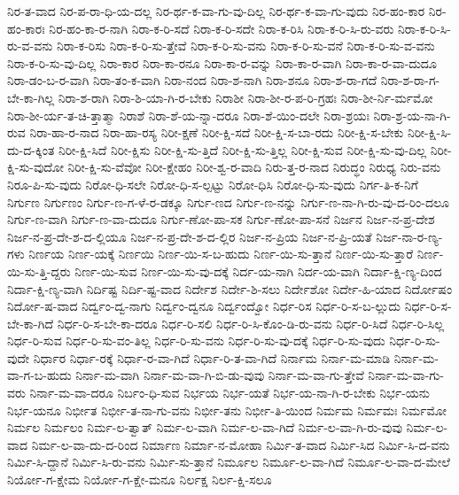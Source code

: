 {ನಿರ-ತ-ವಾದ
ನಿರ-ಪ-ರಾ-ಧಿ-ಯ-ದಲ್ಲ
ನಿರ-ರ್ಥ-ಕ-ವಾ-ಗು-ವು-ದಿಲ್ಲ
ನಿರ-ರ್ಥ-ಕ-ವಾ-ಗು-ವುದು
ನಿರ-ಹಂ-ಕಾರ
ನಿರ-ಹಂ-ಕಾರಃ
ನಿರ-ಹಂ-ಕಾ-ರ-ನಾಗಿ
ನಿರಾ-ಕ-ರಿ-ಸದೆ
ನಿರಾ-ಕ-ರಿ-ಸದೇ
ನಿರಾ-ಕ-ರಿಸಿ
ನಿರಾ-ಕ-ರಿ-ಸಿ-ರು-ವರು
ನಿರಾ-ಕ-ರಿ-ಸಿ-ರು-ವ-ವನು
ನಿರಾ-ಕ-ರಿಸು
ನಿರಾ-ಕ-ರಿ-ಸು-ತ್ತೇವೆ
ನಿರಾ-ಕ-ರಿ-ಸು-ವನು
ನಿರಾ-ಕ-ರಿ-ಸು-ವನೆ
ನಿರಾ-ಕ-ರಿ-ಸು-ವ-ವನು
ನಿರಾ-ಕ-ರಿ-ಸು-ವು-ದಿಲ್ಲ
ನಿರಾ-ಕಾರ
ನಿರಾ-ಕಾ-ರನೂ
ನಿರಾ-ಕಾ-ರ-ವನ್ನು
ನಿರಾ-ಕಾ-ರ-ವಾಗಿ
ನಿರಾ-ಕಾ-ರ-ವಾ-ದುದೂ
ನಿರಾ-ಡಂ-ಬ-ರ-ವಾಗಿ
ನಿರಾ-ತಂ-ಕ-ವಾಗಿ
ನಿರಾ-ನಂದ
ನಿರಾ-ಶ-ನಾಗಿ
ನಿರಾ-ಶನೂ
ನಿರಾ-ಶ-ರಾ-ಗದೆ
ನಿರಾ-ಶ-ರಾ-ಗ-ಬೇ-ಕಾ-ಗಿಲ್ಲ
ನಿರಾ-ಶ-ರಾಗಿ
ನಿರಾ-ಶಿ-ಯಾ-ಗಿ-ರ-ಬೇಕು
ನಿರಾಶೀ
ನಿರಾ-ಶೀ-ರ-ಪ-ರಿ-ಗ್ರಹಃ
ನಿರಾ-ಶೀ-ರ್ನಿ-ರ್ಮಮೋ
ನಿರಾ-ಶೀ-ರ್ಯ-ತ-ಚಿ-ತ್ತಾತ್ಮಾ
ನಿರಾಶೆ
ನಿರಾ-ಶೆ-ಯ-ನ್ನಾ-ದರೂ
ನಿರಾ-ಶೆ-ಯಿಂ-ದಲೇ
ನಿರಾ-ಶ್ರಯಃ
ನಿರಾ-ಶ್ರ-ಯ-ನಾ-ಗಿ-ರುವ
ನಿರಾ-ಹಾ-ರ-ನಾದ
ನಿರಾ-ಹಾ-ರಸ್ಯ
ನಿರೀ-ಕ್ಷಣೆ
ನಿರೀ-ಕ್ಷಿ-ಸದೆ
ನಿರೀ-ಕ್ಷಿ-ಸ-ಬಾ-ರದು
ನಿರೀ-ಕ್ಷಿ-ಸ-ಬೇಕು
ನಿರೀ-ಕ್ಷಿ-ಸಿ-ದು-ದ-ಕ್ಕಿಂತ
ನಿರೀ-ಕ್ಷಿ-ಸಿದೆ
ನಿರೀ-ಕ್ಷಿಸು
ನಿರೀ-ಕ್ಷಿ-ಸು-ತ್ತಿದೆ
ನಿರೀ-ಕ್ಷಿ-ಸು-ತ್ತಿಲ್ಲ
ನಿರೀ-ಕ್ಷಿ-ಸುವ
ನಿರೀ-ಕ್ಷಿ-ಸು-ವು-ದಿಲ್ಲ
ನಿರೀ-ಕ್ಷಿ-ಸು-ವುದೋ
ನಿರೀ-ಕ್ಷಿ-ಸು-ವೆವೋ
ನಿರೀ-ಕ್ಷೇಹಂ
ನಿರೀ-ಶ್ವ-ರ-ವಾದಿ
ನಿರು-ತ್ತ-ರ-ನಾದ
ನಿರುದ್ಧಂ
ನಿರುಧ್ಯ
ನಿರು-ವನು
ನಿರೂ-ಪಿ-ಸು-ವುದು
ನಿರೋ-ಧಿ-ಸಲೇ
ನಿರೋ-ಧಿ-ಸ-ಲ್ಪಟ್ಟು
ನಿರೋ-ಧಿಸಿ
ನಿರೋ-ಧಿ-ಸು-ವುದು
ನಿರ್ಗ-ತಿ-ಕ-ನಿಗೆ
ನಿರ್ಗುಣ
ನಿರ್ಗುಣಂ
ನಿರ್ಗು-ಣ-ಗ-ಳೆ-ರ-ಡಕ್ಕೂ
ನಿರ್ಗು-ಣದ
ನಿರ್ಗು-ಣ-ನನ್ನು
ನಿರ್ಗು-ಣ-ನಾ-ಗಿ-ರು-ವು-ದ-ರಿಂ-ದಲೂ
ನಿರ್ಗು-ಣ-ವಾಗಿ
ನಿರ್ಗು-ಣ-ವಾ-ದುದೂ
ನಿರ್ಗು-ಣೋ-ಪಾ-ಸಕ
ನಿರ್ಗು-ಣೋ-ಪಾ-ಸನೆ
ನಿರ್ಜನ
ನಿರ್ಜ-ನ-ಪ್ರ-ದೇಶ
ನಿರ್ಜ-ನ-ಪ್ರ-ದೇ-ಶ-ದ-ಲ್ಲಿಯೂ
ನಿರ್ಜ-ನ-ಪ್ರ-ದೇ-ಶ-ದ-ಲ್ಲಿರ
ನಿರ್ಜ-ನ-ಪ್ರಿಯ
ನಿರ್ಜ-ನ-ಪ್ರಿ-ಯತೆ
ನಿರ್ಜ-ನಾ-ರ-ಣ್ಯ-ಗಳು
ನಿರ್ಣಯ
ನಿರ್ಣ-ಯಕ್ಕೆ
ನಿರ್ಣಯಿ
ನಿರ್ಣ-ಯಿ-ಸ-ಬ-ಹುದು
ನಿರ್ಣ-ಯಿ-ಸು-ತ್ತಾನೆ
ನಿರ್ಣ-ಯಿ-ಸು-ತ್ತಾರೆ
ನಿರ್ಣ-ಯಿ-ಸು-ತ್ತಿ-ದ್ದರು
ನಿರ್ಣ-ಯಿ-ಸುವ
ನಿರ್ಣ-ಯಿ-ಸು-ವು-ದಕ್ಕೆ
ನಿರ್ದ-ಯ-ನಾಗಿ
ನಿರ್ದ-ಯ-ವಾಗಿ
ನಿರ್ದಾ-ಕ್ಷಿ-ಣ್ಯ-ದಿಂದ
ನಿರ್ದಾ-ಕ್ಷಿ-ಣ್ಯ-ವಾಗಿ
ನಿರ್ದಿಷ್ಟ
ನಿರ್ದಿ-ಷ್ಟ-ವಾದ
ನಿರ್ದೇಶ
ನಿರ್ದೇ-ಶಿ-ಸಲು
ನಿರ್ದೇಶೋ
ನಿರ್ದೇ-ಹಿ-ಯಾದ
ನಿರ್ದೋಷಂ
ನಿರ್ದೋ-ಷ-ವಾದ
ನಿರ್ದ್ವಂ-ದ್ವ-ನಾಗು
ನಿರ್ದ್ವಂ-ದ್ವನೂ
ನಿರ್ದ್ವಂದ್ವೋ
ನಿರ್ಧ-ರಿಸ
ನಿರ್ಧ-ರಿ-ಸ-ಬ-ಲ್ಲುದು
ನಿರ್ಧ-ರಿ-ಸ-ಬೇ-ಕಾ-ಗಿದೆ
ನಿರ್ಧ-ರಿ-ಸ-ಬೇ-ಕಾ-ದರೂ
ನಿರ್ಧ-ರಿ-ಸಲಿ
ನಿರ್ಧ-ರಿ-ಸಿ-ಕೊಂ-ಡಿ-ರು-ವನು
ನಿರ್ಧ-ರಿ-ಸಿದೆ
ನಿರ್ಧ-ರಿ-ಸಿಲ್ಲ
ನಿರ್ಧ-ರಿ-ಸುವ
ನಿರ್ಧ-ರಿ-ಸು-ವಂ-ತಿಲ್ಲ
ನಿರ್ಧ-ರಿ-ಸು-ವನು
ನಿರ್ಧ-ರಿ-ಸು-ವು-ದಕ್ಕೆ
ನಿರ್ಧ-ರಿ-ಸು-ವುದು
ನಿರ್ಧ-ರಿ-ಸು-ವುದೇ
ನಿರ್ಧಾರ
ನಿರ್ಧಾ-ರಕ್ಕೆ
ನಿರ್ಧಾ-ರ-ವಾ-ಗಿದೆ
ನಿರ್ಧಾ-ರಿ-ತ-ವಾ-ಗಿದೆ
ನಿರ್ನಾಮ
ನಿರ್ನಾ-ಮ-ಮಾಡಿ
ನಿರ್ನಾ-ಮ-ವಾ-ಗ-ಬ-ಹುದು
ನಿರ್ನಾ-ಮ-ವಾಗಿ
ನಿರ್ನಾ-ಮ-ವಾ-ಗಿ-ಬಿ-ಡು-ವುವು
ನಿರ್ನಾ-ಮ-ವಾ-ಗು-ತ್ತೇವೆ
ನಿರ್ನಾ-ಮ-ವಾ-ಗು-ವರು
ನಿರ್ನಾ-ಮ-ವಾ-ದರೂ
ನಿರ್ಬಂ-ಧಿ-ಸುವ
ನಿರ್ಭಯ
ನಿರ್ಭ-ಯತೆ
ನಿರ್ಭ-ಯ-ನಾ-ಗಿ-ರ-ಬೇಕು
ನಿರ್ಭ-ಯನು
ನಿರ್ಭ-ಯನೂ
ನಿರ್ಭೀತ
ನಿರ್ಭೀ-ತ-ನಾ-ಗು-ವನು
ನಿರ್ಭೀ-ತನು
ನಿರ್ಭೀ-ತಿ-ಯಿಂದ
ನಿರ್ಮಮ
ನಿರ್ಮಮಃ
ನಿರ್ಮಮೋ
ನಿರ್ಮಲ
ನಿರ್ಮಲಂ
ನಿರ್ಮ-ಲ-ತ್ವಾತ್
ನಿರ್ಮ-ಲ-ವಾಗಿ
ನಿರ್ಮ-ಲ-ವಾ-ಗಿದೆ
ನಿರ್ಮ-ಲ-ವಾ-ಗಿ-ರು-ವುವು
ನಿರ್ಮ-ಲ-ವಾದ
ನಿರ್ಮ-ಲ-ವಾ-ದು-ದ-ರಿಂದ
ನಿರ್ಮಾಣ
ನಿರ್ಮಾ-ನ-ಮೋಹಾ
ನಿರ್ಮಿ-ತ-ವಾದ
ನಿರ್ಮಿ-ಸಿದ
ನಿರ್ಮಿ-ಸಿ-ದ-ವನು
ನಿರ್ಮಿ-ಸಿ-ದ್ದಾನೆ
ನಿರ್ಮಿ-ಸಿ-ರು-ವನು
ನಿರ್ಮಿ-ಸು-ತ್ತಾನೆ
ನಿರ್ಮೂಲ
ನಿರ್ಮೂ-ಲ-ವಾ-ಗಿದೆ
ನಿರ್ಮೂ-ಲ-ವಾ-ದ-ಮೇಲೆ
ನಿರ್ಯೋ-ಗ-ಕ್ಷೇಮ
ನಿರ್ಯೋ-ಗ-ಕ್ಷೇ-ಮನೂ
ನಿರ್ಲಕ್ಷ
ನಿರ್ಲ-ಕ್ಷಿ-ಸಲೂ
}
